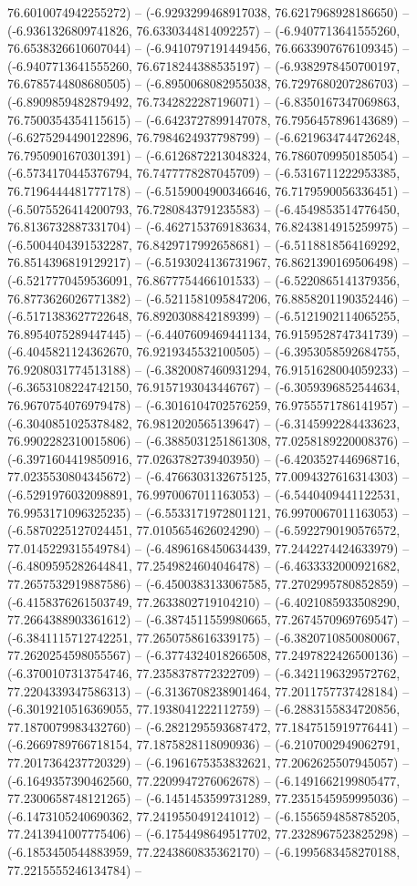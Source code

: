 76.6010074942255272) -- (-6.9293299468917038, 76.6217968928186650) -- (-6.9361326809741826, 76.6330344814092257) -- (-6.9407713641555260, 76.6538326610607044) -- (-6.9410797191449456, 76.6633907676109345) -- (-6.9407713641555260, 76.6718244388535197) -- (-6.9382978450700197, 76.6785744808680505) -- (-6.8950068082955038, 76.7297680207286703) -- (-6.8909859482879492, 76.7342822287196071) -- (-6.8350167347069863, 76.7500354354115615) -- (-6.6423727899147078, 76.7956457896143689) -- (-6.6275294490122896, 76.7984624937798799) -- (-6.6219634744726248, 76.7950901670301391) -- (-6.6126872213048324, 76.7860709950185054) -- (-6.5734170445376794, 76.7477778287045709) -- (-6.5316711222953385, 76.7196444481777178) -- (-6.5159004900346646, 76.7179590056336451) -- (-6.5075526414200793, 76.7280843791235583) -- (-6.4549853514776450, 76.8136732887331704) -- (-6.4627153769183634, 76.8243814915259975) -- (-6.5004404391532287, 76.8429717992658681) -- (-6.5118818564169292, 76.8514396819129217) -- (-6.5193024136731967, 76.8621390169506498) -- (-6.5217770459536091, 76.8677754466101533) -- (-6.5220865141379356, 76.8773626026771382) -- (-6.5211581095847206, 76.8858201190352446) -- (-6.5171383627722648, 76.8920308842189399) -- (-6.5121902114065255, 76.8954075289447445) -- (-6.4407609469441134, 76.9159528747341739) -- (-6.4045821124362670, 76.9219345532100505) -- (-6.3953058592684755, 76.9208031774513188) -- (-6.3820087460931294, 76.9151628004059233) -- (-6.3653108224742150, 76.9157193043446767) -- (-6.3059396852544634, 76.9670754076979478) -- (-6.3016104702576259, 76.9755571786141957) -- (-6.3040851025378482, 76.9812020565139647) -- (-6.3145992284433623, 76.9902282310015806) -- (-6.3885031251861308, 77.0258189220008376) -- (-6.3971604419850916, 77.0263782739403950) -- (-6.4203527446968716, 77.0235530804345672) -- (-6.4766303132675125, 77.0094327616314303) -- (-6.5291976032098891, 76.9970067011163053) -- (-6.5440409441122531, 76.9953171096325235) -- (-6.5533171972801121, 76.9970067011163053) -- (-6.5870225127024451, 77.0105654626024290) -- (-6.5922790190576572, 77.0145229315549784) -- (-6.4896168450634439, 77.2442274424633979) -- (-6.4809595282644841, 77.2549824604046478) -- (-6.4633332000921682, 77.2657532919887586) -- (-6.4500383133067585, 77.2702995780852859) -- (-6.4158376261503749, 77.2633802719104210) -- (-6.4021085933508290, 77.2664388903361612) -- (-6.3874511559980665, 77.2674570969769547) -- (-6.3841115712742251, 77.2650758616339175) -- (-6.3820710850080067, 77.2620254598055567) -- (-6.3774324018266508, 77.2497822426500136) -- (-6.3700107313754746, 77.2358378772322709) -- (-6.3421196329572762, 77.2204339347586313) -- (-6.3136708238901464, 77.2011757737428184) -- (-6.3019210516369055, 77.1938041222112759) -- (-6.2883155834720856, 77.1870079983432760) -- (-6.2821295593687472, 77.1847515919776441) -- (-6.2669789766718154, 77.1875828118090936) -- (-6.2107002949062791, 77.2017364237720329) -- (-6.1961675353832621, 77.2062625507945057) -- (-6.1649357390462560, 77.2209947276062678) -- (-6.1491662199805477, 77.2300658748121265) -- (-6.1451453599731289, 77.2351545959995036) -- (-6.1473105240690362, 77.2419550491241012) -- (-6.1556594858785205, 77.2413941007775406) -- (-6.1754498649517702, 77.2328967523825298) -- (-6.1853450544883959, 77.2243860835362170) -- (-6.1995683458270188, 77.2215555246134784) -- 
